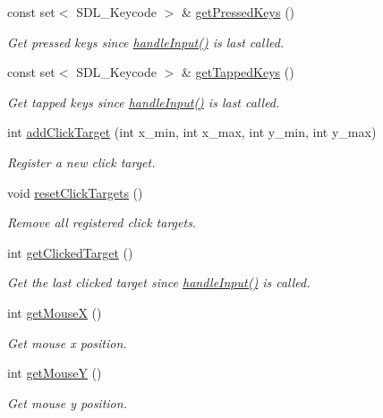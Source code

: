 \begin{DoxyCompactItemize}
const set$<$ S\+D\+L\+\_\+\+Keycode $>$ \& \mbox{\hyperlink{class_graphics_a772ed930cc5ae22dcdc35b4094bffbce}{get\+Pressed\+Keys}} ()
\begin{DoxyCompactList}\small\item\em Get pressed keys since \mbox{\hyperlink{class_graphics_adff993cdcd0ed498c82cf7be87ead4f1}{handle\+Input()}} is last called. \end{DoxyCompactList}\item 
const set$<$ S\+D\+L\+\_\+\+Keycode $>$ \& \mbox{\hyperlink{class_graphics_a0444c93625b87614ed8a742d8833e5ad}{get\+Tapped\+Keys}} ()
\begin{DoxyCompactList}\small\item\em Get tapped keys since \mbox{\hyperlink{class_graphics_adff993cdcd0ed498c82cf7be87ead4f1}{handle\+Input()}} is last called. \end{DoxyCompactList}\item 
int \mbox{\hyperlink{class_graphics_acf2ad5a746e2cdb9c16dd742b1455603}{add\+Click\+Target}} (int x\+\_\+min, int x\+\_\+max, int y\+\_\+min, int y\+\_\+max)
\begin{DoxyCompactList}\small\item\em Register a new click target. \end{DoxyCompactList}\item 
void \mbox{\hyperlink{class_graphics_aedd2af95b26f8b2077e266f692818ea2}{reset\+Click\+Targets}} ()
\begin{DoxyCompactList}\small\item\em Remove all registered click targets. \end{DoxyCompactList}\item 
int \mbox{\hyperlink{class_graphics_a53c02790c4103525e542982175f1addb}{get\+Clicked\+Target}} ()
\begin{DoxyCompactList}\small\item\em Get the last clicked target since \mbox{\hyperlink{class_graphics_adff993cdcd0ed498c82cf7be87ead4f1}{handle\+Input()}} is called. \end{DoxyCompactList}\item 
int \mbox{\hyperlink{class_graphics_a48c86f4a3a87446fd8df707899e92d4f}{get\+MouseX}} ()
\begin{DoxyCompactList}\small\item\em Get mouse x position. \end{DoxyCompactList}\item 
int \mbox{\hyperlink{class_graphics_a4e21e1cfcd4523e86ddbc9c5d246de1e}{get\+MouseY}} ()
\begin{DoxyCompactList}\small\item\em Get mouse y position. \end{DoxyCompactList}\end{DoxyCompactItemize}


